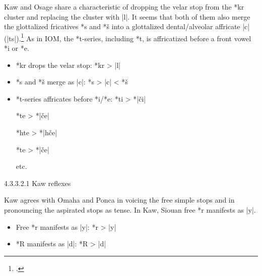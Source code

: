 \documentclass[output=paper]{LSP/langsci}
\begin{document}

Kaw and Osage share a characteristic of dropping the velar stop from the *kr cluster and replacing the cluster with |l|.  It seems that both of them also merge the glottalized fricatives *s\textsuperscript{} and *š\textsuperscript{} into a glottalized dental/alveolar affricate |c\textsuperscript{}| (|ts\textsuperscript{}|).\footnote{\citealt[856]{CSD2006}.} As in IOM, the *t-series, including *t\textsuperscript{}, is affricatized before a front vowel *i or *e.  

\begin{itemize}
\item *kr drops the velar stop: \hspace{3em} *kr	>	|l|
\item *s\textsuperscript{} and *š\textsuperscript{} merge as |c\textsuperscript{}|: \hspace{3em} *s\textsuperscript{}	>	|c\textsuperscript{}|	<	*š\textsuperscript{}

\item *t-series affricates before *i/*e: \hspace{1em} *ti	>	*|\v{c}i|

\hspace{14em} *te	>	*|\v{c}e|

\hspace{14em} *hte	>	*|h\v{c}e|

\hspace{14em} *t\textsuperscript{}e	>	*|\v{c}\textsuperscript{}e|

\hspace{14em} etc.
\end{itemize}

4.3.3.2.1  Kaw reflexes
\vspace{1em}

Kaw agrees with Omaha and Ponca in voicing the free simple stops and in pronouncing the aspirated stops as tense.  In Kaw, Siouan free *r manifests as |y|.

\begin{itemize}
\item Free *r manifests as |y|: \hspace{1em} *r	>	|y|
\item *R manifests as |d|: \hspace{3em} *R	>	|d|
\end{itemize}
\end{document}
